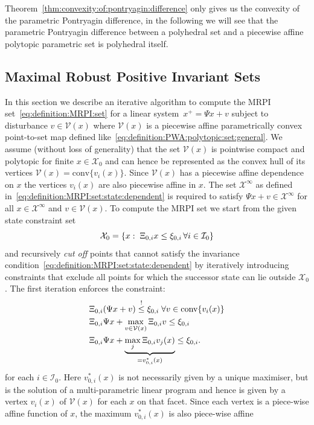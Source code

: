 \documentclass[journal]{IEEEtran}
\providecommand{\conv}{\text{conv}}
\theoremstyle{remark}
\theoremstyle{definition}
\begin{document}
%
Theorem~\ref{thm:convexity:of:pontryagin:difference} only gives us the convexity of the parametric
Pontryagin difference, in the following we will see that the parametric Pontryagin difference between
a polyhedral set and a piecewise affine polytopic parametric set is polyhedral itself.
%
%
%
%
%
%
\subsection{Maximal Robust Positive Invariant Sets}
%
In this section we describe an iterative algorithm to compute the MRPI set~\eqref{eq:definition:MRPI:set}
for a linear system~$x^+=\Psi x + v$ subject to disturbance
$v\in\mathcal V(x)$ where $\mathcal V(x)$ is a piecewise affine parametrically convex point-to-set map defined 
like~\eqref{eq:definition:PWA:polytopic:set:general}.
%
We assume (without loss of generality) that the set $\mathcal V(x)$ is pointwise compact and polytopic 
for finite $x\in\mathcal X_0$ and can hence be represented as the 
convex hull of its vertices $\mathcal V(x) = \conv\{v_i(x)\}$. 
%
Since ${\mathcal{V}}(x)$
has a piecewise affine dependence on $x$ the vertices $v_i(x)$ are also piecewise affine in $x$.
The set $\mathcal X^\infty$ as defined in~\eqref{eq:definition:MRPI:set:state:dependent} 
is required to satisfy $\Psi x + v\in\mathcal X^\infty$ for all
$x\in\mathcal X^\infty$ and $v\in\mathcal V(x)$. To compute the MRPI set we start from the given 
state constraint set
\[
\mathcal X_0 = \{x:\;\Xi_{0,i}x\leq \xi_{0,i}\,\forall i\in\mathcal I_0\}
\]
and
recursively \emph{cut off} points that cannot satisfy the invariance condition~\eqref{eq:definition:MRPI:set:state:dependent}
by iteratively introducing constraints that exclude all points for which the successor state can lie outside 
$\mathcal X_0$. The first iteration enforces the constraint:
%
\[
\begin{split}
  &\genmat_{0,i}(\Psi x + v)\overset{!}{\leq}\genvec_{0,i}\;\forall v\in\conv\{v_i(x)\}\\
  &\genmat_{0,i}\Psi x + \max_{v\in\mathcal V(x)} \genmat_{0,i} v \leq \genvec_{0,i}\\
  &\genmat_{0,i}\Psi x + \underbrace{\max_{j} \genmat_{0,i} v_j(x)}_{=v_{0,i}^\ast(x)} \leq \genvec_{0,i}.
\end{split}
\]
%
for each $i\in \mathcal I_0$.
Here $v_{0,i}^\ast(x)$ is not necessarily given by a unique maximiser, 
but is the solution of a multi-parametric linear program and hence is given 
by a vertex $v_i(x)$ of $\mathcal V(x)$ for each $x$ on that facet.
Since each vertex is a piece-wise affine function of $x$, the maximum $v_{0,i}^\ast(x)$ is also piece-wise affine
\end{document}

